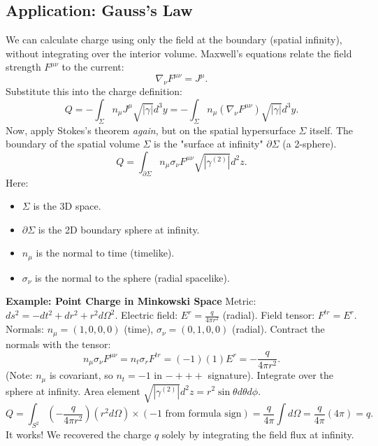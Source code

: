 \documentclass[11pt, a4paper]{report}
\begin{document}

\subsection*{Application: Gauss's Law}
We can calculate charge using only the field at the boundary (spatial infinity), without integrating over the interior volume.
Maxwell's equations relate the field strength $F^{\mu\nu}$ to the current:
\begin{equation}
\nabla_\nu F^{\mu\nu} = J^\mu.
\end{equation}
Substitute this into the charge definition:
\begin{equation}
Q = - \int_\Sigma n_\mu J^\mu \sqrt{|\gamma|} d^3 y = - \int_\Sigma n_\mu (\nabla_\nu F^{\mu\nu}) \sqrt{|\gamma|} d^3 y.
\end{equation}
Now, apply Stokes's theorem \textit{again}, but on the spatial hypersurface $\Sigma$ itself. The boundary of the spatial volume $\Sigma$ is the "surface at infinity" $\partial \Sigma$ (a 2-sphere).
\begin{equation}
Q = \int_{\partial \Sigma} n_\mu \sigma_\nu F^{\mu\nu} \sqrt{|\gamma^{(2)}|} d^2 z.
\end{equation}
Here:
\begin{itemize}
    \item $\Sigma$ is the 3D space.
    \item $\partial \Sigma$ is the 2D boundary sphere at infinity.
    \item $n_\mu$ is the normal to time (timelike).
    \item $\sigma_\nu$ is the normal to the sphere (radial spacelike).
\end{itemize}

\textbf{Example: Point Charge in Minkowski Space}
Metric: $ds^2 = -dt^2 + dr^2 + r^2 d\Omega^2$.
Electric field: $E^r = \frac{q}{4\pi r^2}$ (radial).
Field tensor: $F^{tr} = E^r$.
Normals: $n_\mu = (1, 0, 0, 0)$ (time), $\sigma_\nu = (0, 1, 0, 0)$ (radial).
Contract the normals with the tensor:
\begin{equation}
n_\mu \sigma_\nu F^{\mu\nu} = n_t \sigma_r F^{tr} = (-1)(1) E^r = - \frac{q}{4\pi r^2}.
\end{equation}
(Note: $n_\mu$ is covariant, so $n_t = -1$ in $-+++$ signature).
Integrate over the sphere at infinity. Area element $\sqrt{|\gamma^{(2)}|} d^2 z = r^2 \sin\theta d\theta d\phi$.
\begin{equation}
Q = \int_{S^2} \left( - \frac{q}{4\pi r^2} \right) (r^2 d\Omega) \times (-1 \text{ from formula sign}) = \frac{q}{4\pi} \int d\Omega = \frac{q}{4\pi} (4\pi) = q.
\end{equation}
It works! We recovered the charge $q$ solely by integrating the field flux at infinity.
\end{document}
